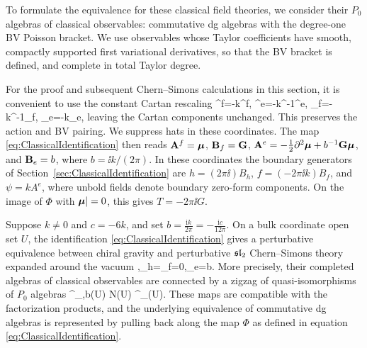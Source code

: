 \documentclass[11pt]{amsart}
\numberwithin{equation}{section}
\numberwithin{figure}{section}
\numberwithin{table}{section}
\begin{document}
To formulate the equivalence for these classical field theories, we consider their $P_0$ algebras of classical observables: commutative dg algebras with the degree-one BV Poisson bracket.
We use observables whose Taylor coefficients have smooth, compactly supported first variational derivatives, so that the BV bracket is defined, and complete in total Taylor degree.

For the proof and subsequent Chern--Simons calculations in this section, it is convenient to use
the constant Cartan rescaling
\be
 \widehat{\bA}^{f}=-k\bA^f,\qquad
 \widehat{\bA}^{e}=-k^{-1}\bA^e,\qquad
 \widehat{\bB}_{f}=-k^{-1}\bB_f,\qquad
 \widehat{\bB}_{e}=-k\bB_e,
\ee
leaving the Cartan components unchanged. This preserves the action and BV pairing.
We suppress hats in these coordinates. The map \eqref{eq:ClassicalIdentification} then reads
$\mathbf{A}^f=\boldsymbol{\mu}$, $\mathbf{B}_f=\mathbf{G}$,
$\mathbf{A}^e=-\tfrac12\partial^2\boldsymbol{\mu}+b^{-1}\mathbf{G}\boldsymbol{\mu}$, and $\mathbf{B}_e=b$,
where $b=\ii k/(2\pi)$.
In these coordinates the boundary generators of Section~\ref{sec:ClassicalIdentification} are
$h=(2\pi\ii)B_h$, $f=(-2\pi\ii k)B_f$, and $\psi=kA^e$, where unbold fields denote boundary zero-form components.
On the image of $\Phi$ with $\boldsymbol{\mu}|=0$, this gives $T=-2\pi\ii G$.


\begin{thm}\label{thm:ClassicalEquivalence}
	Suppose $k\neq 0$ and $c=-6k$, and set $b=\frac{\mathrm{i} k}{2\pi}=-\frac{\mathrm{i} c}{12\pi}$.
	On a bulk coordinate open set $U$, the identification \eqref{eq:ClassicalIdentification} gives a perturbative
	equivalence between chiral gravity and perturbative $\mathfrak{sl}_2$ Chern--Simons theory expanded around the
	vacuum
	\be
	,\qquad \bB_h=\bB_f=0,\qquad \bB_e=b.
	\ee
	More precisely, their completed algebras of classical observables are connected by a zigzag of quasi-isomorphisms of $P_0$ algebras
	\be\label{eq:ClassicalPzeroZigzag}
	^{}_{,b}(U)
	\xleftarrow{\ \simeq\ } \mathcal N(U)
	\xrightarrow{\ \simeq\ } ^{}_{}(U).
	\ee
	These maps are compatible with the factorization products, and the underlying equivalence of commutative dg algebras
	is represented by pulling back along the map $\Phi$ as defined in equation \eqref{eq:ClassicalIdentification}.
\end{thm}
\end{document}
